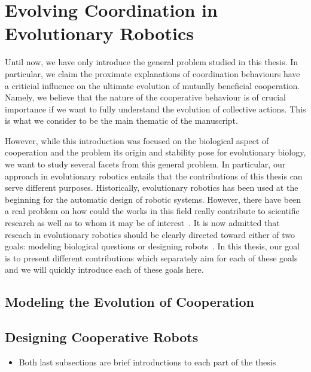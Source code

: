 \section{Evolving Coordination in Evolutionary Robotics}

  Until now, we have only introduce the general problem studied in this thesis. In particular, we claim the proximate explanations of coordination behaviours have a criticial influence on the ultimate evolution of mutually beneficial cooperation. Namely, we believe that the nature of the cooperative behaviour is of crucial importance if we want to fully understand the evolution of collective actions. This is what we consider to be the main thematic of the manuscript. 

  However, while this introduction was focused on the biological aspect of cooperation and the problem its origin and stability pose for evolutionary biology, we want to study several facets from this general problem. In particular, our approach in evolutionary robotics entails that the contributions of this thesis can serve different purposes. Historically, evolutionary robotics has been used at the beginning for the automatic design of robotic systems. However, there have been a real problem on how could the works in this field really contribute to scientific research as well as to whom it may be of interest~\parencite{Trianni2014b, Doncieux2015a}. It is now admitted that reseach in evolutionary robotics should be clearly directed toward either of two goals: modeling biological questions or designing robots~\parencite{Trianni2014b}. In this thesis, our goal is to present different contributions which separately aim for each of these goals and we will quickly introduce each of these goals here.

  
  \subsection{Modeling the Evolution of Cooperation}

    


  \subsection{Designing Cooperative Robots}
    \begin{itemize}
      \item{Both last subsections are brief introductions to each part of the thesis}
    \end{itemize}
